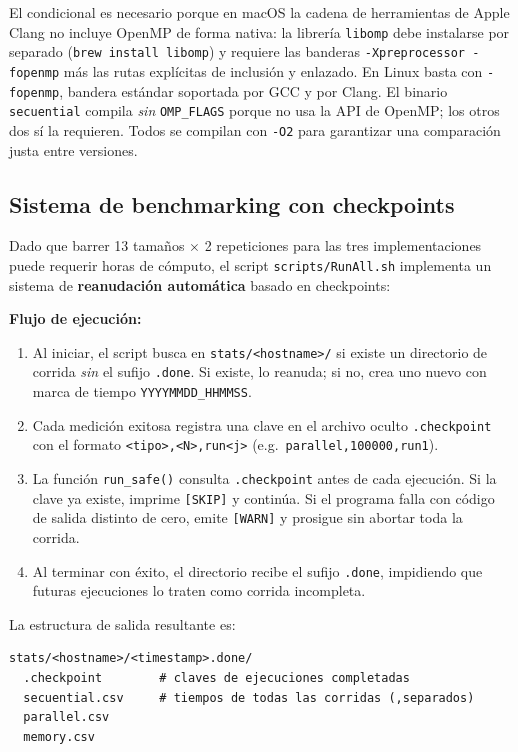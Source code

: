 \documentclass{article}
\begin{document}
El condicional es necesario porque en macOS la cadena de herramientas de Apple Clang no
incluye OpenMP de forma nativa: la librer\'ia \texttt{libomp} debe instalarse por
separado (\texttt{brew install libomp}) y requiere las banderas
\texttt{-Xpreprocessor -fopenmp} m\'as las rutas expl\'icitas de inclusi\'on y
enlazado. En Linux basta con \texttt{-fopenmp}, bandera est\'andar soportada por GCC y
por Clang. El binario \texttt{secuential} compila \emph{sin} \texttt{OMP\_FLAGS} porque
no usa la API de OpenMP; los otros dos s\'i la requieren. Todos se compilan con
\texttt{-O2} para garantizar una comparaci\'on justa entre versiones.

\subsection{Sistema de benchmarking con checkpoints}

Dado que barrer 13 tama\~nos $\times$ 2 repeticiones para las tres implementaciones
puede requerir horas de c\'omputo, el script \texttt{scripts/RunAll.sh} implementa un
sistema de \textbf{reanudaci\'on autom\'atica} basado en checkpoints:

\textbf{Flujo de ejecuci\'on:}
\begin{enumerate}
    \item Al iniciar, el script busca en \texttt{stats/<hostname>/} si existe un
          directorio de corrida \emph{sin} el sufijo \texttt{.done}. Si existe, lo
          reanuda; si no, crea uno nuevo con marca de tiempo \texttt{YYYYMMDD\_HHMMSS}.
    \item Cada medici\'on exitosa registra una clave en el archivo oculto
          \texttt{.checkpoint} con el formato \texttt{<tipo>,<N>,run<j>}
          (e.g.\ \texttt{parallel,100000,run1}).
    \item La funci\'on \texttt{run\_safe()} consulta \texttt{.checkpoint} antes de cada
          ejecuci\'on. Si la clave ya existe, imprime \texttt{[SKIP]} y contin\'ua. Si el
          programa falla con c\'odigo de salida distinto de cero, emite \texttt{[WARN]} y
          prosigue sin abortar toda la corrida.
    \item Al terminar con \'exito, el directorio recibe el sufijo \texttt{.done},
          impidiendo que futuras ejecuciones lo traten como corrida incompleta.
\end{enumerate}

La estructura de salida resultante es:
\begin{verbatim}
stats/<hostname>/<timestamp>.done/
  .checkpoint        # claves de ejecuciones completadas
  secuential.csv     # tiempos de todas las corridas (,separados)
  parallel.csv
  memory.csv
\end{verbatim}
\end{document}
